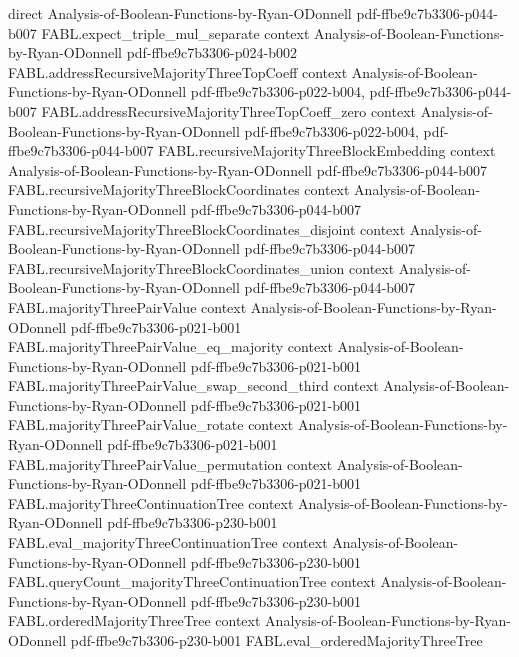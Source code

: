 \begin{theorem}
  {direct}
  {Analysis-of-Boolean-Functions-by-Ryan-ODonnell}
  {pdf-ffbe9c7b3306-p044-b007}
\proofstep
  {FABL.expect_triple_mul_separate}
  {context}
  {Analysis-of-Boolean-Functions-by-Ryan-ODonnell}
  {pdf-ffbe9c7b3306-p024-b002}
\proofstep
  {FABL.addressRecursiveMajorityThreeTopCoeff}
  {context}
  {Analysis-of-Boolean-Functions-by-Ryan-ODonnell}
  {pdf-ffbe9c7b3306-p022-b004,
    pdf-ffbe9c7b3306-p044-b007}
\proofstep
  {FABL.addressRecursiveMajorityThreeTopCoeff_zero}
  {context}
  {Analysis-of-Boolean-Functions-by-Ryan-ODonnell}
  {pdf-ffbe9c7b3306-p022-b004,
    pdf-ffbe9c7b3306-p044-b007}
\proofstep
  {FABL.recursiveMajorityThreeBlockEmbedding}
  {context}
  {Analysis-of-Boolean-Functions-by-Ryan-ODonnell}
  {pdf-ffbe9c7b3306-p044-b007}
\proofstep
  {FABL.recursiveMajorityThreeBlockCoordinates}
  {context}
  {Analysis-of-Boolean-Functions-by-Ryan-ODonnell}
  {pdf-ffbe9c7b3306-p044-b007}
\proofstep
  {FABL.recursiveMajorityThreeBlockCoordinates_disjoint}
  {context}
  {Analysis-of-Boolean-Functions-by-Ryan-ODonnell}
  {pdf-ffbe9c7b3306-p044-b007}
\proofstep
  {FABL.recursiveMajorityThreeBlockCoordinates_union}
  {context}
  {Analysis-of-Boolean-Functions-by-Ryan-ODonnell}
  {pdf-ffbe9c7b3306-p044-b007}
\proofstep
  {FABL.majorityThreePairValue}
  {context}
  {Analysis-of-Boolean-Functions-by-Ryan-ODonnell}
  {pdf-ffbe9c7b3306-p021-b001}
\proofstep
  {FABL.majorityThreePairValue_eq_majority}
  {context}
  {Analysis-of-Boolean-Functions-by-Ryan-ODonnell}
  {pdf-ffbe9c7b3306-p021-b001}
\proofstep
  {FABL.majorityThreePairValue_swap_second_third}
  {context}
  {Analysis-of-Boolean-Functions-by-Ryan-ODonnell}
  {pdf-ffbe9c7b3306-p021-b001}
\proofstep
  {FABL.majorityThreePairValue_rotate}
  {context}
  {Analysis-of-Boolean-Functions-by-Ryan-ODonnell}
  {pdf-ffbe9c7b3306-p021-b001}
\proofstep
  {FABL.majorityThreePairValue_permutation}
  {context}
  {Analysis-of-Boolean-Functions-by-Ryan-ODonnell}
  {pdf-ffbe9c7b3306-p021-b001}
\proofstep
  {FABL.majorityThreeContinuationTree}
  {context}
  {Analysis-of-Boolean-Functions-by-Ryan-ODonnell}
  {pdf-ffbe9c7b3306-p230-b001}
\proofstep
  {FABL.eval_majorityThreeContinuationTree}
  {context}
  {Analysis-of-Boolean-Functions-by-Ryan-ODonnell}
  {pdf-ffbe9c7b3306-p230-b001}
\proofstep
  {FABL.queryCount_majorityThreeContinuationTree}
  {context}
  {Analysis-of-Boolean-Functions-by-Ryan-ODonnell}
  {pdf-ffbe9c7b3306-p230-b001}
\proofstep
  {FABL.orderedMajorityThreeTree}
  {context}
  {Analysis-of-Boolean-Functions-by-Ryan-ODonnell}
  {pdf-ffbe9c7b3306-p230-b001}
\proofstep
  {FABL.eval_orderedMajorityThreeTree}

\end{theorem}
